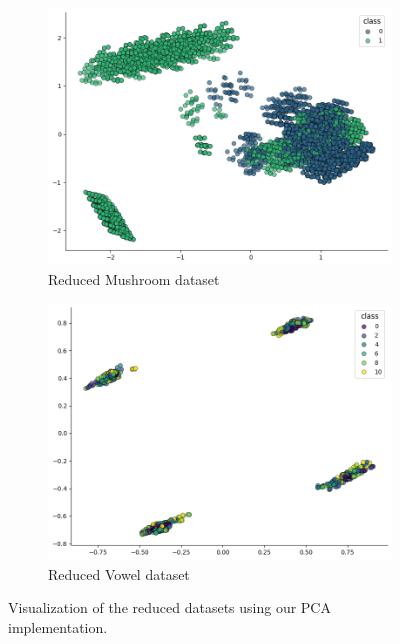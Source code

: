 \begin{figure}[h!]
    \centering
    \begin{subfigure}[b]{0.45\textwidth}
        \centering
        \includegraphics[width=\textwidth]{figures/mushroom_our_pca.png}
        \caption{Reduced Mushroom dataset}
        \label{our_pca_mushroom}
    \end{subfigure}
    \hfill
    \begin{subfigure}[b]{0.45\textwidth}
        \centering
        \includegraphics[width=\textwidth]{figures/vowel_our_pca.png}
        \caption{Reduced Vowel dataset}
        \label{our_pca_vowel}
    \end{subfigure}
    
    \caption{Visualization of the reduced datasets using our PCA implementation.}
    \label{fig:our_pca_datasets}
\end{figure}


